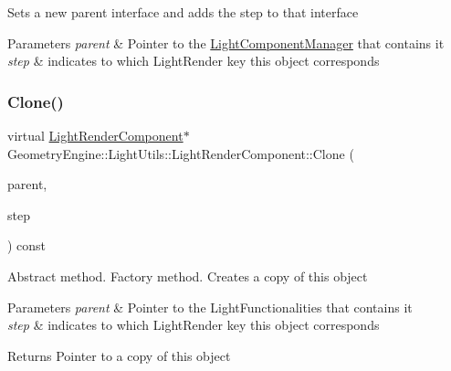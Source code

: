 Sets a new parent interface and adds the step to that interface 
\begin{DoxyParams}{Parameters}
{\em parent} & Pointer to the \mbox{\hyperlink{class_geometry_engine_1_1_light_utils_1_1_light_component_manager}{Light\+Component\+Manager}} that contains it \\
\hline
{\em step} & indicates to which Light\+Render key this object corresponds \\
\hline
\end{DoxyParams}
\mbox{\label{class_geometry_engine_1_1_light_utils_1_1_light_render_component_a0311667e3f6faa30c938303e8eaa9670}} 
\subsubsection{\texorpdfstring{Clone()}{Clone()}}
{\footnotesize\ttfamily virtual \mbox{\hyperlink{class_geometry_engine_1_1_light_utils_1_1_light_render_component}{Light\+Render\+Component}}$\ast$ Geometry\+Engine\+::\+Light\+Utils\+::\+Light\+Render\+Component\+::\+Clone (\begin{DoxyParamCaption}\item[{\mbox{\hyperlink{class_geometry_engine_1_1_light_utils_1_1_light_component_manager}{Light\+Component\+Manager}} $\ast$}]{parent,  }\item[{\mbox{\hyperlink{namespace_geometry_engine_1_1_light_utils_ac3078de660742daceaa06bd9bc61d24a}{Light\+Render}}}]{step }\end{DoxyParamCaption}) const\hspace{0.3cm}{\ttfamily [pure virtual]}}

Abstract method. Factory method. Creates a copy of this object 
\begin{DoxyParams}{Parameters}
{\em parent} & Pointer to the Light\+Functionalities that contains it \\
\hline
{\em step} & indicates to which Light\+Render key this object corresponds \\
\hline
\end{DoxyParams}
\begin{DoxyReturn}{Returns}
Pointer to a copy of this object 
\end{DoxyReturn}


